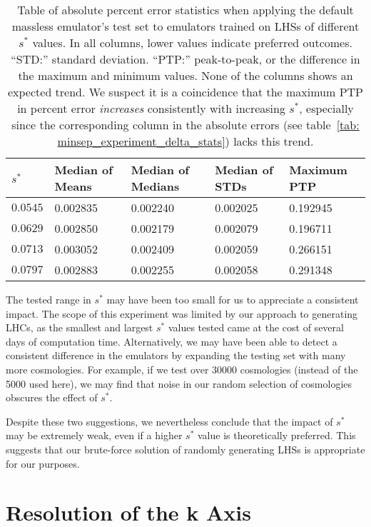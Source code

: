 \begin{table}[ht!]
\centering
\begin{tabular}{l|l|l|l|l}
\hline
$s^*$ & Median of Means & Median of Medians & Median of STDs & Maximum PTP \\ \hline
$0.0545$ & 0.002835 & 0.002240 & 0.002025 & 0.192945 \\
$0.0629$ & 0.002850 & 0.002179 & 0.002079 & 0.196711 \\
$0.0713$ & 0.003052 & 0.002409 & 0.002059 & 0.266151 \\
$0.0797$ & 0.002883 & 0.002255 & 0.002058 & 0.291348 \\
\end{tabular}
	\cprotect\caption[$s^*$ Experiment: Percent Error Statistics]{Table of
		absolute percent error statistics
		when applying the default massless emulator's test
		set to emulators trained on LHSs of different $s^*$ values. In all
		columns, lower values indicate preferred outcomes. ``STD:'' standard
		deviation. ``PTP:'' peak-to-peak, or the difference in the maximum
		and minimum values. None of the columns shows an expected trend.
		We suspect it is a coincidence that the maximum PTP in percent error
		\textit{increases} consistently with increasing $s^*$, especially
		since the corresponding column in the absolute errors
		(see table~\ref{tab: minsep_experiment_delta_stats}) lacks this
		trend.}
 \label{tab: minsep_experiment_percerr_stats}
\end{table}

The tested range in $s^*$ may have been too small for us to appreciate a
consistent impact. The scope of this experiment was limited by our approach
to generating LHCs, as the smallest and largest $s^*$ values tested came at
the cost of several days of computation time. Alternatively, we may have been
able to detect a consistent difference in the emulators by expanding the
testing set with many more cosmologies. For example, if we test over
30000 cosmologies (instead of the 5000 used here), we may find that noise in
our random selection of cosmologies obscures the effect of $s^*$.

Despite these two suggestions, we nevertheless conclude that the impact of
$s^*$ may be extremely weak, even if a higher $s^*$ value is theoretically
preferred. This suggests that our brute-force solution of randomly generating
LHSs is appropriate for our purposes.


\section{Resolution of the k Axis}
\label{sec: Nk_experiment}

